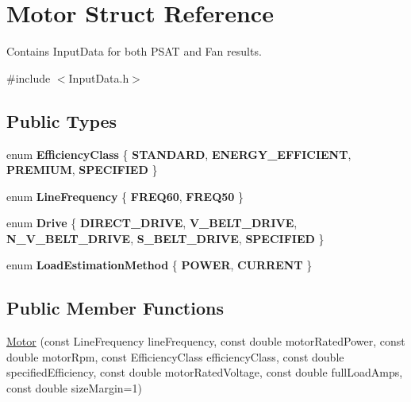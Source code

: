 \hypertarget{struct_motor}{}\section{Motor Struct Reference}
\label{struct_motor}


Contains Input\+Data for both P\+S\+AT and Fan results.  




{\ttfamily \#include $<$Input\+Data.\+h$>$}

\subsection*{Public Types}
\begin{DoxyCompactItemize}
\item 
\mbox{\label{struct_motor_afa022971ae062406a9f588c601673d4e}} 
enum {\bfseries Efficiency\+Class} \{ {\bfseries S\+T\+A\+N\+D\+A\+RD}, 
{\bfseries E\+N\+E\+R\+G\+Y\+\_\+\+E\+F\+F\+I\+C\+I\+E\+NT}, 
{\bfseries P\+R\+E\+M\+I\+UM}, 
{\bfseries S\+P\+E\+C\+I\+F\+I\+ED}
 \}
\item 
\mbox{\label{struct_motor_acee1bdf1b684ad36cb80dc2829d9fcee}} 
enum {\bfseries Line\+Frequency} \{ {\bfseries F\+R\+E\+Q60}, 
{\bfseries F\+R\+E\+Q50}
 \}
\item 
\mbox{\label{struct_motor_a7ebc378cf0aee50a8d2b99f0e0a53047}} 
enum {\bfseries Drive} \{ \newline
{\bfseries D\+I\+R\+E\+C\+T\+\_\+\+D\+R\+I\+VE}, 
{\bfseries V\+\_\+\+B\+E\+L\+T\+\_\+\+D\+R\+I\+VE}, 
{\bfseries N\+\_\+\+V\+\_\+\+B\+E\+L\+T\+\_\+\+D\+R\+I\+VE}, 
{\bfseries S\+\_\+\+B\+E\+L\+T\+\_\+\+D\+R\+I\+VE}, 
\newline
{\bfseries S\+P\+E\+C\+I\+F\+I\+ED}
 \}
\item 
\mbox{\label{struct_motor_a6f8326215d659b4e6961510281e4af4b}} 
enum {\bfseries Load\+Estimation\+Method} \{ {\bfseries P\+O\+W\+ER}, 
{\bfseries C\+U\+R\+R\+E\+NT}
 \}
\end{DoxyCompactItemize}
\subsection*{Public Member Functions}
\begin{DoxyCompactItemize}
\item 
\hyperlink{struct_motor_a0cc70d1db8f8a1128465871e2297f2d9}{Motor} (const Line\+Frequency line\+Frequency, const double motor\+Rated\+Power, const double motor\+Rpm, const Efficiency\+Class efficiency\+Class, const double specified\+Efficiency, const double motor\+Rated\+Voltage, const double full\+Load\+Amps, const double size\+Margin=1)
\end{DoxyCompactItemize}
